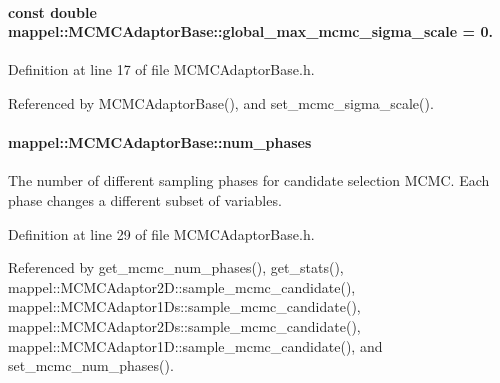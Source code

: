 \paragraph[{\texorpdfstring{global\+\_\+max\+\_\+mcmc\+\_\+sigma\+\_\+scale}{global_max_mcmc_sigma_scale}}]{\setlength{\rightskip}{0pt plus 5cm}const double mappel\+::\+M\+C\+M\+C\+Adaptor\+Base\+::global\+\_\+max\+\_\+mcmc\+\_\+sigma\+\_\+scale = 0.\hspace{0.3cm}{\ttfamily [static]}}\hypertarget{classmappel_1_1MCMCAdaptorBase_aebc93881ca351e67de867238a62579eb}{}\label{classmappel_1_1MCMCAdaptorBase_aebc93881ca351e67de867238a62579eb}


Definition at line 17 of file M\+C\+M\+C\+Adaptor\+Base.\+h.



Referenced by M\+C\+M\+C\+Adaptor\+Base(), and set\+\_\+mcmc\+\_\+sigma\+\_\+scale().

\paragraph[{\texorpdfstring{num\+\_\+phases}{num_phases}}]{ mappel\+::\+M\+C\+M\+C\+Adaptor\+Base\+::num\+\_\+phases\hspace{0.3cm}{\ttfamily [protected]}}\hypertarget{classmappel_1_1MCMCAdaptorBase_a44b90a984ace712584074dc17831fe25}{}\label{classmappel_1_1MCMCAdaptorBase_a44b90a984ace712584074dc17831fe25}
The number of different sampling phases for candidate selection M\+C\+MC. Each phase changes a different subset of variables. 

Definition at line 29 of file M\+C\+M\+C\+Adaptor\+Base.\+h.



Referenced by get\+\_\+mcmc\+\_\+num\+\_\+phases(), get\+\_\+stats(), mappel\+::\+M\+C\+M\+C\+Adaptor2\+D\+::sample\+\_\+mcmc\+\_\+candidate(), mappel\+::\+M\+C\+M\+C\+Adaptor1\+Ds\+::sample\+\_\+mcmc\+\_\+candidate(), mappel\+::\+M\+C\+M\+C\+Adaptor2\+Ds\+::sample\+\_\+mcmc\+\_\+candidate(), mappel\+::\+M\+C\+M\+C\+Adaptor1\+D\+::sample\+\_\+mcmc\+\_\+candidate(), and set\+\_\+mcmc\+\_\+num\+\_\+phases().

